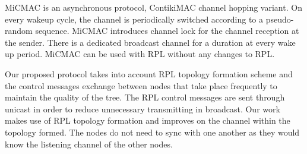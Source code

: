 MiCMAC \cite{micmac} is an asynchronous protocol, ContikiMAC \cite{contikimac} channel hopping variant. On every wakeup cycle, the channel is periodically switched according to a pseudo-random sequence. MiCMAC introduces channel lock for the channel reception at the sender. There is a dedicated broadcast channel for a duration at every wake up period. MiCMAC can be used with RPL without any changes to RPL. %

Our proposed protocol takes into account RPL topology formation scheme and the control messages exchange between nodes that take place frequently to maintain the quality of the tree. The RPL control messages are sent through unicast in order to reduce unnecessary transmitting in broadcast. Our work makes use of RPL topology formation and improves on the channel within the topology formed. The nodes do not need to sync with one another as they would know the listening channel of the other nodes.




